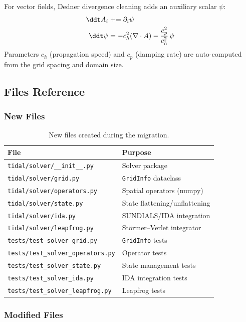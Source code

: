 For vector fields, Dedner divergence cleaning adds an auxiliary scalar $\psi$:
\begin{align}
  \ddt A_i &\mathrel{+}= \partial_i \psi \\
  \ddt \psi &= -c_h^2 (\nabla \cdot A) - \frac{c_p^2}{c_h^2}\, \psi
\end{align}
Parameters $c_h$ (propagation speed) and $c_p$ (damping rate) are auto-computed
from the grid spacing and domain size.

\subsection{Files Reference}
\label{sec:files-reference}

\subsubsection{New Files}

\begin{table}[htbp]
\centering
\caption{New files created during the migration.}
\label{tab:new-files}
\begin{tabular}{@{}ll@{}}
\toprule
File & Purpose \\
\midrule
\texttt{tidal/solver/\_\_init\_\_.py} & Solver package \\
\texttt{tidal/solver/grid.py} & \texttt{GridInfo} dataclass \\
\texttt{tidal/solver/operators.py} & Spatial operators (numpy) \\
\texttt{tidal/solver/state.py} & State flattening/unflattening \\
\texttt{tidal/solver/ida.py} & SUNDIALS/IDA integration \\
\texttt{tidal/solver/leapfrog.py} & St\"ormer--Verlet integrator \\
\texttt{tests/test\_solver\_grid.py} & \texttt{GridInfo} tests \\
\texttt{tests/test\_solver\_operators.py} & Operator tests \\
\texttt{tests/test\_solver\_state.py} & State management tests \\
\texttt{tests/test\_solver\_ida.py} & IDA integration tests \\
\texttt{tests/test\_solver\_leapfrog.py} & Leapfrog tests \\
\bottomrule
\end{tabular}
\end{table}

\subsubsection{Modified Files}

